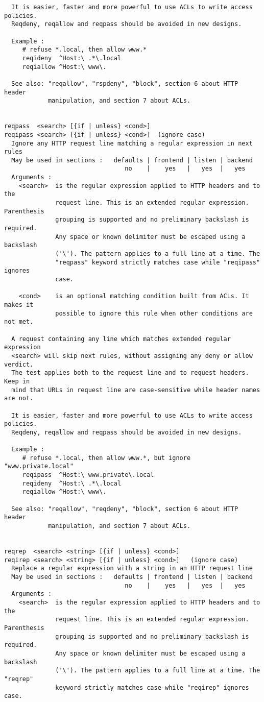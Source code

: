 \begin{verbatim}
  It is easier, faster and more powerful to use ACLs to write access policies.
  Reqdeny, reqallow and reqpass should be avoided in new designs.

  Example :
     # refuse *.local, then allow www.*
     reqideny  ^Host:\ .*\.local
     reqiallow ^Host:\ www\.

  See also: "reqallow", "rspdeny", "block", section 6 about HTTP header
            manipulation, and section 7 about ACLs.


reqpass  <search> [{if | unless} <cond>]
reqipass <search> [{if | unless} <cond>]  (ignore case)
  Ignore any HTTP request line matching a regular expression in next rules
  May be used in sections :   defaults | frontend | listen | backend
                                 no    |    yes   |   yes  |   yes
  Arguments :
    <search>  is the regular expression applied to HTTP headers and to the
              request line. This is an extended regular expression. Parenthesis
              grouping is supported and no preliminary backslash is required.
              Any space or known delimiter must be escaped using a backslash
              ('\'). The pattern applies to a full line at a time. The
              "reqpass" keyword strictly matches case while "reqipass" ignores
              case.

    <cond>    is an optional matching condition built from ACLs. It makes it
              possible to ignore this rule when other conditions are not met.

  A request containing any line which matches extended regular expression
  <search> will skip next rules, without assigning any deny or allow verdict.
  The test applies both to the request line and to request headers. Keep in
  mind that URLs in request line are case-sensitive while header names are not.

  It is easier, faster and more powerful to use ACLs to write access policies.
  Reqdeny, reqallow and reqpass should be avoided in new designs.

  Example :
     # refuse *.local, then allow www.*, but ignore "www.private.local"
     reqipass  ^Host:\ www.private\.local
     reqideny  ^Host:\ .*\.local
     reqiallow ^Host:\ www\.

  See also: "reqallow", "reqdeny", "block", section 6 about HTTP header
            manipulation, and section 7 about ACLs.


reqrep  <search> <string> [{if | unless} <cond>]
reqirep <search> <string> [{if | unless} <cond>]   (ignore case)
  Replace a regular expression with a string in an HTTP request line
  May be used in sections :   defaults | frontend | listen | backend
                                 no    |    yes   |   yes  |   yes
  Arguments :
    <search>  is the regular expression applied to HTTP headers and to the
              request line. This is an extended regular expression. Parenthesis
              grouping is supported and no preliminary backslash is required.
              Any space or known delimiter must be escaped using a backslash
              ('\'). The pattern applies to a full line at a time. The "reqrep"
              keyword strictly matches case while "reqirep" ignores case.


\end{verbatim}

